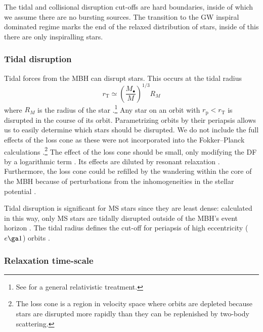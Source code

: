 \documentclass[useAMS,usedcolumn,usegraphicx,usenatbib]{mn2e}
\newcommand{\sub}[1]{\ensuremath{_\mathrm{#1}}}
\begin{document}
The tidal and collisional disruption cut-offs are hard boundaries, inside of which we assume there are no bursting sources. The transition to the GW inspiral dominated regime marks the end of the relaxed distribution of stars, inside of this there are only inspiralling stars.

\subsubsection{Tidal disruption}\label{sec:Tidal}

Tidal forces from the MBH can disrupt stars. This occurs at the tidal radius
\begin{equation}
r\sub{T} \simeq \left(\frac{M_\bullet}{M}\right)^{1/3}R_M
\label{eq:Tidal}
\end{equation}
where $R_M$ is the radius of the star \citep{Hills1975, Rees1988, Kobayashi2004}.\footnote{See \citet{Kesden2012} for a general relativistic treatment.} Any star on an orbit with $r\sub{p} < r\sub{T}$ is disrupted in the course of its orbit. Parametrizing orbits by their periapsis allows us to easily determine which stars should be disrupted. We do not include the full effects of the loss cone \citep{Frank1976, Lightman1977, Cohn1978} as these were not incorporated into the Fokker--Planck calculations \citep{Hopman2009}.\footnote{The loss cone is a region in velocity space where orbits are depleted because stars are disrupted more rapidly than they can be replenished by two-body scattering.} The effect of the loss cone should be small, only modifying the DF by a logarithmic term \citep{Lightman1977, Bahcall1977, Cohn1978}. Its effects are diluted by resonant relaxation \citep{Hopman2007,Toonen2009,Merritt2011}. Furthermore, the loss cone could be refilled by the wandering within the core of the MBH because of perturbations from the inhomogeneities in the stellar potential \citep{Sigurdsson1997,Chatterjee2002,Merritt2007}.

Tidal disruption is significant for MS stars since they are least dense: calculated in this way, only MS stars are tidally disrupted outside of the MBH's event horizon \citep{Sigurdsson1997}. The tidal radius defines the cut-off for periapsis of high eccentricity ($e \ga 1$) orbits \citep{Lightman1977}.

\subsubsection{Relaxation time-scale}\label{sec:Relax}
\end{document}
